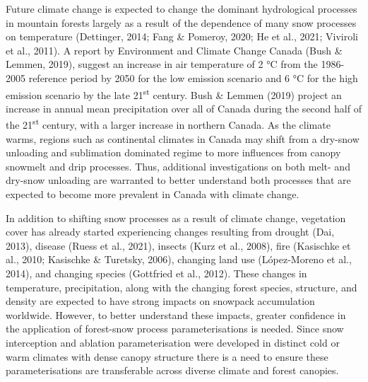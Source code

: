 \documentclass[
  letterpaper,
]{tex/uofsthesis-cs}
\begin{document}
Future climate change is expected to change the dominant hydrological
processes in mountain forests largely as a result of the dependence of
many snow processes on temperature (Dettinger, 2014; Fang \& Pomeroy,
2020; He et al., 2021; Viviroli et al., 2011). A report by Environment
and Climate Change Canada (Bush \& Lemmen, 2019), suggest an increase in
air temperature of 2 °C from the 1986-2005 reference period by 2050 for
the low emission scenario and 6 °C for the high emission scenario by the
late 21\textsuperscript{st} century. Bush \& Lemmen (2019) project an
increase in annual mean precipitation over all of Canada during the
second half of the 21\textsuperscript{st} century, with a larger
increase in northern Canada. As the climate warms, regions such as
continental climates in Canada may shift from a dry-snow unloading and
sublimation dominated regime to more influences from canopy snowmelt and
drip processes. Thus, additional investigations on both melt- and
dry-snow unloading are warranted to better understand both processes
that are expected to become more prevalent in Canada with climate
change.

In addition to shifting snow processes as a result of climate change,
vegetation cover has already started experiencing changes resulting from
drought (Dai, 2013), disease (Ruess et al., 2021), insects (Kurz et al.,
2008), fire (Kasischke et al., 2010; Kasischke \& Turetsky, 2006),
changing land use (López-Moreno et al., 2014), and changing species
(Gottfried et al., 2012). These changes in temperature, precipitation,
along with the changing forest species, structure, and density are
expected to have strong impacts on snowpack accumulation worldwide.
However, to better understand these impacts, greater confidence in the
application of forest-snow process parameterisations is needed. Since
snow interception and ablation parameterisation were developed in
distinct cold or warm climates with dense canopy structure there is a
need to ensure these parameterisations are transferable across diverse
climate and forest canopies.
\end{document}
